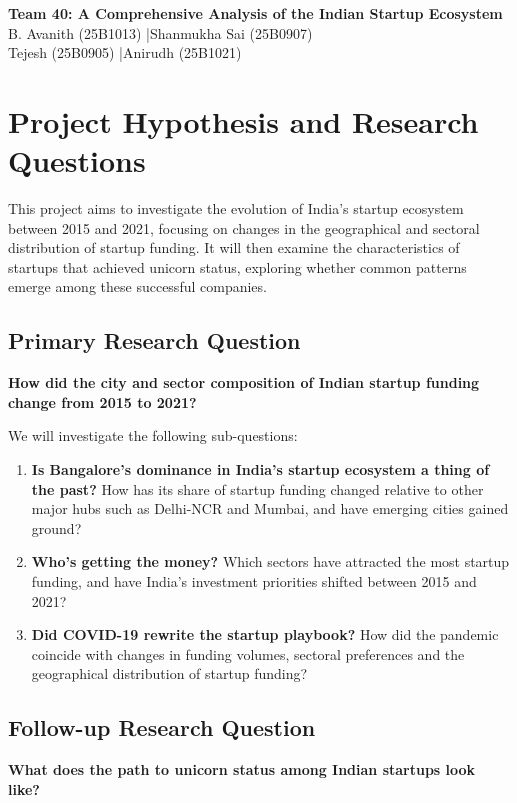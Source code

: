 \documentclass[10pt,a4paper]{article}
\begin{document}
\begin{center}
  {\LARGE\bfseries\color{navy} Team 40: A Comprehensive Analysis of the Indian Startup Ecosystem}\\[4pt]
  {\small
  B. Avanith (25B1013) \quad|\quad Shanmukha Sai (25B0907)\\
  Tejesh (25B0905) \quad|\quad Anirudh (25B1021)}
\end{center}
\vspace{-2pt}


\section{Project Hypothesis and Research Questions}

This project aims to investigate the evolution of India's startup
ecosystem between 2015 and 2021, focusing on changes in the geographical
and sectoral distribution of startup funding. It will then examine the
characteristics of startups that achieved unicorn status, exploring
whether common patterns emerge among these successful companies.

\subsection*{Primary Research Question}
\textbf{How did the city and sector composition of Indian startup
funding change from 2015 to 2021?}

We will investigate the following sub-questions:

\begin{enumerate}
    \item \textbf{Is Bangalore's dominance in India's startup ecosystem
    a thing of the past?} How has its share of startup funding changed
    relative to other major hubs such as Delhi-NCR and Mumbai, and
    have emerging cities gained ground?

    \item \textbf{Who's getting the money?} Which sectors have attracted
    the most startup funding, and have India's investment priorities
    shifted between 2015 and 2021?

    \item \textbf{Did COVID-19 rewrite the startup playbook?} How did
    the pandemic coincide with changes in funding volumes, sectoral
    preferences and the geographical distribution of startup funding?
\end{enumerate}

\subsection*{Follow-up Research Question}
\textbf{What does the path to unicorn status among Indian startups
look like?}
\end{document}
